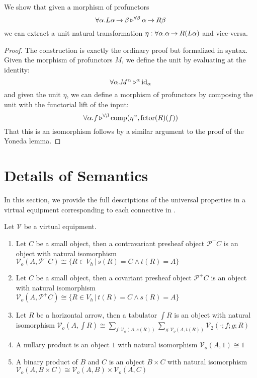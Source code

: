 \documentclass{llncs}
\begin{document}
\begin{lemma}
  We show that given a morphism of profunctors
  \[ \forall \alpha. L\alpha \mathop{\to_{}} \beta \mathop{\triangleright^{\forall \beta}} \alpha \mathop{\to_{}} R \beta\]
  we can extract a unit natural transformation $\eta : \forall \alpha. \alpha \mathop{\to_{}} R(L\alpha)$ and vice-versa.
\end{lemma}
\begin{proof}
  The construction is exactly the ordinary proof but formalized in \vett{} syntax.
  Given the morphism of profunctors $M$, we define the unit by evaluating at the identity:
  \[ \forall \alpha. M^{\alpha} \mathop{\triangleright^{\alpha}} \textrm{id}_{\alpha} \]
  and given the unit $\eta$, we can define a morphism of profunctors
  by composing the unit with the functorial lift of the input:
  \[ \forall \alpha. f \mathop{\triangleright^{\forall \beta}} \textrm{comp}(\eta^{\alpha}, \textrm{fctor}(R)(f))\]
  That this is an isomorphism follows by a similar argument to the
  proof of the Yoneda lemma.
\end{proof}

\section{Details of Semantics}
\label{sec:appendix:semantics}

In this section, we provide the full descriptions of the universal
properties in a virtual equipment corresponding to each connective in
\vett{}.

\begin{definition}
  Let $\mathcal V$ be a virtual equipment.
  \begin{enumerate}
  \item Let $C$ be a small object, then a contravariant presheaf object $\mathcal P^- C$ is an object with natural isomorphism
    $\mathcal V_o(A, \mathcal P^- C) \cong \{ R \in V_h \,|\, s(R) = C \wedge t(R) = A \}$
  \item Let $C$ be a small object, then a covariant presheaf object $\mathcal P^+ C$ is an object with natural isomorphism
    $\mathcal V_o(A, \mathcal P^+ C) \cong \{ R \in V_h \,|\, t(R) = C \wedge s(R) = A \}$
  \item Let $R$ be a horizontal arrow, then a tabulator $\int R$ is an object with natural isomorphism
    $\mathcal V_o(A, \int R) \cong \sum_{f : {\mathcal V}_o(A, s(R))}\sum_{g : {\mathcal V}_o(A, t(R))}{\mathcal V}_2(\cdot;f;g;R)$
  \item A nullary product is an object $1$ with natural isomorphism $\mathcal V_o(A,1) \cong 1$
  \item A binary product of $B$ and $C$ is an object $B \times C$ with natural isomorphism $\mathcal V_o(A,B \times C) \cong {\mathcal V}_o(A,B)  \times {\mathcal V}_o(A,C) $
  \end{enumerate}
\end{definition}
\end{document}
